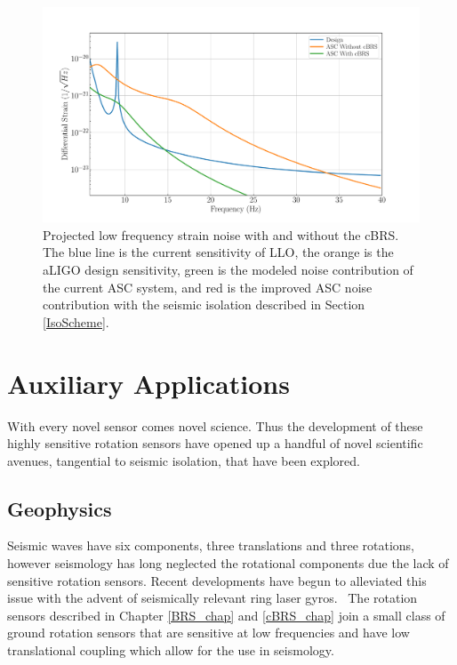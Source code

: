\documentclass [12pt, proquest]{uwthesis}[2019]
\begin{document}
\begin{figure}[!h]
\begin{center}
\includegraphics[width=\textwidth]{cBRS_ASC.pdf}
\caption[Projected low frequency strain noise with and without the cBRS]{Projected low frequency strain noise with and without the cBRS. The blue line is the current sensitivity of LLO, the orange is the aLIGO design sensitivity, green is the modeled noise contribution of the current ASC system, and red is the improved ASC noise contribution with the seismic isolation described in Section \ref{IsoScheme}. }
\label{ascStrain}
\end{center}
\end{figure}

\chapter{Auxiliary Applications}
\quad With every novel sensor comes novel science. Thus the development of these highly sensitive rotation sensors have opened up a handful of novel scientific avenues, tangential to seismic isolation, that have been explored.

\section{Geophysics}
Seismic waves have six components, three translations and three rotations, however seismology has long neglected the rotational components due the lack of sensitive rotation sensors. Recent developments have begun to alleviated this issue with the advent of seismically relevant ring laser gyros.~\cite{ring} The rotation sensors described in Chapter \ref{BRS_chap} and \ref{cBRS_chap} join a small class of ground rotation sensors that are sensitive at low frequencies and have low translational coupling which allow for the use in seismology.
\end{document}
